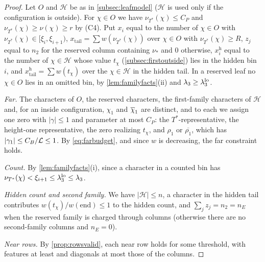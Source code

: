 \begin{proof}
Let $O$ and $\mathcal H$ be as in \cref{subsec:leafmodel} ($\mathcal H$ is used only if the
configuration is outside). For
$\chi\in O$ we have $\nu_{T^*}(\chi)\le C_P$ and $\nu_{T^*}(\chi)\ge\nu(\chi)\ge r$ by (C4). Put $x_i$
equal to the number of $\chi\in O$ with $\nu_{T^*}(\chi)\in[\xi_i,\xi_{i+1})$, $x_{\mathrm{tail}}=\sum w(\nu_{T^*}(\chi))$
over $\chi\in O$ with $\nu_{T^*}(\chi)\ge R$, $z_j$ equal to $n_2$ for the reserved column containing
$\nu_*$ and $0$ otherwise, $x^{\mathrm h}_i$ equal to the number of $\chi\in\mathcal H$ whose value $t_\chi$
(\cref{subsec:firstoutside}) lies in the hidden bin $i$, and $x^{\mathrm h}_{\mathrm{tail}}=\sum w(t_\chi)$ over the
$\chi\in\mathcal H$ in the hidden tail. In a reserved leaf no $\chi\in O$ lies in an omitted bin, by \cref{lem:familyfacts}(ii) and
$\lambda_3\ge\lambda_3^{\mathrm{lo}}$.

\emph{Far.} The characters of $O$, the reserved characters, the first-family characters of $\mathcal
H$ and, for an inside configuration, $\chi_1$ and $\overline{\chi}_1$ are distinct, and to each we assign one
zero with $|\gamma|\le1$ and parameter at most $C_P$: the $T^*$-representative, the height-one
representative, the zero realizing $t_\chi$, and $\rho_1$ or $\overline{\rho_1}$, which has
$|\gamma_1|\le C_B/\mathcal{L}\le1$. By \eqref{eq:farbudget}, and since $w$ is decreasing, the far
constraint holds.

\emph{Count.} By \cref{lem:familyfacts}(i), since a character in a counted bin has
$\nu_{T^*}(\chi)<\xi_{i+1}\le\lambda_3^{\mathrm{lo}}\le\lambda_3$.

\emph{Hidden count and second family.} We have $|\mathcal H|\le n$, a character in the hidden
tail contributes $w(t_\chi)/w(\mathrm{end})\le1$ to the hidden count, and $\sum_jz_j=n_2=n_E$ when the reserved
family is charged through columns (otherwise there are no second-family columns and $n_E=0$).

\emph{Near rows.} By \cref{prop:rowsvalid}, each near row holds for some threshold, with features at
least and diagonals at most those of the columns.


\end{proof}
